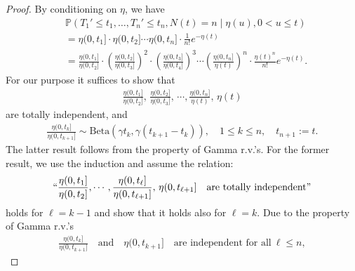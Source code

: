 \documentclass[11pt,leqno%
]{amsart}
\renewcommand{\P }{{\mathbb P}}
\newcommand{\1}{{\mathbf 1}}
\begin{document}
\begin{proof}
 By conditioning on $\eta$, we have 
 \begin{align}
  & \P(T_1' \le t_1,\ldots,T_n' \le t_n, N(t)=n \mid \eta(u), 0<u \le
  t ) \nonumber \\
  &= \eta(0,t_1]\cdot \eta(0,t_2] \cdots \eta(0,t_n]\cdot \frac{1}{n!}
  e^{-\eta(t)} \nonumber \\
  &= \frac{\eta(0,t_1]}{\eta(0,t_2]}\cdot \left(
 \frac{\eta(0,t_2]}{\eta(0,t_3]}
\right)^2 \cdot \left(
 \frac{\eta(0,t_3]}{\eta(0,t_4]}
\right)^3 \cdots \left(
\frac{\eta(0,t_n]}{\eta(t)}
\right)^n \cdot \frac{\eta(t)^n}{n!} e^{-\eta(t)}. \label{eq:condieta1}
 \end{align}
For our purpose it suffices to show that 
\begin{align*}
 \frac{\eta(0,t_1]}{\eta(0,t_2]},\, \frac{\eta(0,t_2]}{\eta(0,t_3]},\,
 \cdots, \frac{\eta(0,t_n]}{\eta(t)},\,
 \eta(t)
\end{align*}
are totally independent, and 
\begin{align*}
 \frac{\eta(0,t_{k}]}{\eta(0,t_{k+1}]}\sim \mathrm{Beta}
 (\gamma t_k,\gamma(t_{k+1}-t_k)),\quad 1\le k\le n,\quad t_{n+1}:=t. 
\end{align*}
The latter result follows from the property of Gamma r.v.'s. 
For the former result, 
we use the induction and assume the relation:  
\begin{align}
\label{induction:indep}
 ``\frac{\eta(0,t_1]}{\eta(0,t_2]}, \cdots,
 \frac{\eta(0,t_{\ell}]}{\eta(0,t_{\ell+1}]},\, \eta(0,t_{\ell+1}] \quad \text{are totally independent''}
\end{align}  
holds for $\ell=k-1$ and show that it holds also for $\ell=k$. 
Due to the property of Gamma r.v.'s %
\begin{align*}
 \frac{\eta(0,t_{k}]}{\eta(0,t_{k+1}]}\quad \text{and}\quad \eta(0,t_{k+1}]\quad \text{are
 independent for all}\ \ell \le n,  

\end{align*}
\end{proof}
\end{document}
